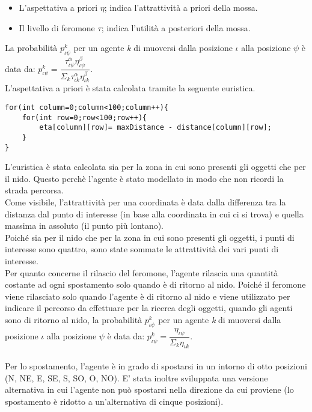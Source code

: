 \documentclass[12pt,a4paper,openright,twoside]{report}
\begin{document}
\begin{itemize}
	\item L'aspettativa a priori $\eta$; indica l'attrattività a priori della mossa.
	\item Il livello di feromone $\tau$; indica l'utilità a posteriori della mossa.
\end{itemize}

La probabilità $p^k_{\iota\psi}$ per un agente \textit{k} di muoversi dalla posizione $\iota$ alla posizione $\psi$ è data da: $p^k_{\iota\psi}= \dfrac{\tau^\alpha_{\iota\psi}\eta^\beta_{\iota\psi}}{\Sigma_k\tau^\alpha_{\iota k}\eta^\beta_{\iota k}}$. \\

L'aspettativa a priori è stata calcolata tramite la seguente euristica. \\

\begin{verbatim}
for(int column=0;column<100;column++){
    for(int row=0;row<100;row++){
        eta[column][row]= maxDistance - distance[column][row];
    }
}
\end{verbatim}

L'euristica è stata calcolata sia per la zona in cui sono presenti gli oggetti che per il nido. Questo perchè l'agente è stato modellato in modo che non ricordi la strada percorsa.\\
Come visibile, l'attrattività per una coordinata è data dalla differenza tra la distanza dal punto di interesse (in base alla coordinata in cui ci si trova) e quella massima in assoluto (il punto più lontano).\\
Poiché sia per il nido che per la zona in cui sono presenti gli oggetti, i punti di interesse sono quattro, sono state sommate le attrattività dei vari punti di interesse.\\
Per quanto concerne il rilascio del feromone, l'agente rilascia una quantità costante ad ogni spostamento solo quando è di ritorno al nido. Poiché il feromone viene rilasciato solo quando l'agente è di ritorno al nido e viene utilizzato per indicare il percorso da effettuare per la ricerca degli oggetti, quando gli agenti sono di ritorno al nido, la probabilità  $p^k_{\iota\psi}$ per un agente \textit{k} di muoversi dalla posizione $\iota$ alla posizione $\psi$ è data da: $p^k_{\iota\psi}= \dfrac{\eta_{\iota\psi}}{\Sigma_k\eta_{\iota k}}$. \\\\
Per lo spostamento, l'agente è in grado di spostarsi in un intorno di otto posizioni (N, NE, E, SE, S, SO, O, NO). E' stata inoltre sviluppata una versione alternativa in cui l'agente non può spostarsi nella direzione da cui proviene (lo spostamento è ridotto a un'alternativa di cinque posizioni).
\end{document}
